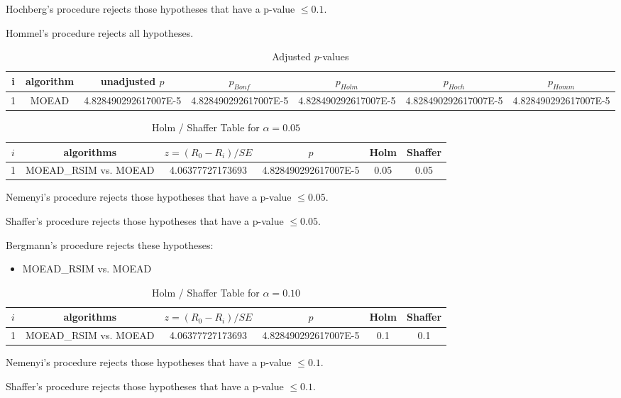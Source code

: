 \documentclass[a4paper,10pt]{article}
\begin{document}
\begin{landscape}
Hochberg's procedure rejects those hypotheses that have a p-value $\le0.1$.


Hommel's procedure rejects all hypotheses.


\begin{table}[!htp]
\centering\tiny
\caption{Adjusted $p$-values}
\begin{tabular}{ccccccc}
i&algorithm&unadjusted $p$&$p_{Bonf}$&$p_{Holm}$&$p_{Hoch}$&$p_{Homm}$\\
\hline
1&MOEAD&4.828490292617007E-5&4.828490292617007E-5&4.828490292617007E-5&4.828490292617007E-5&4.828490292617007E-5\\
\hline
\end{tabular}
\end{table}

\begin{table}[!htp]
\centering\tiny
\caption{Holm / Shaffer Table for $\alpha=0.05$}
\begin{tabular}{cccccc}
$i$&algorithms&$z=(R_0 - R_i)/SE$&$p$&Holm&Shaffer\\
\hline
1&MOEAD_RSIM vs. MOEAD&4.06377727173693&4.828490292617007E-5&0.05&0.05\\
\hline
\end{tabular}
\end{table}
Nemenyi's procedure rejects those hypotheses that have a p-value $\le0.05$.


Shaffer's procedure rejects those hypotheses that have a p-value $\le0.05$.


Bergmann's procedure rejects these hypotheses:


\begin{itemize}


\item MOEAD_RSIM vs. MOEAD
\end{itemize}


\begin{table}[!htp]
\centering\tiny
\caption{Holm / Shaffer Table for $\alpha=0.10$}
\begin{tabular}{cccccc}
$i$&algorithms&$z=(R_0 - R_i)/SE$&$p$&Holm&Shaffer\\
\hline
1&MOEAD_RSIM vs. MOEAD&4.06377727173693&4.828490292617007E-5&0.1&0.1\\
\hline
\end{tabular}
\end{table}
Nemenyi's procedure rejects those hypotheses that have a p-value $\le0.1$.


Shaffer's procedure rejects those hypotheses that have a p-value $\le0.1$.



\end{landscape}
\end{document}

